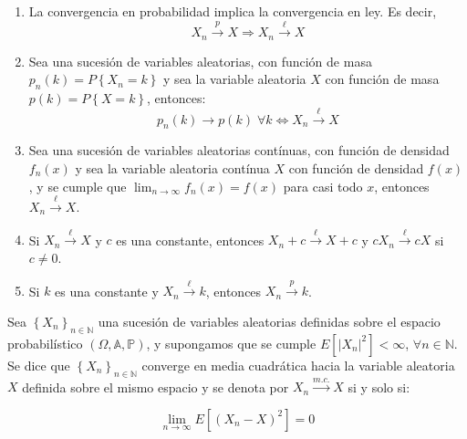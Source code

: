 
\begin{enumerate}
\item 
\begin{teorema}
    La convergencia en probabilidad implica la convergencia en ley. Es decir, 
     \begin{equation}
X_{n} \overset{p}{\to} X \Rightarrow X_{n} \overset{\ell}{\to} X
\end{equation}
\end{teorema}
\item 
\begin{teorema}
    Sea una sucesi\'on de variables aleatorias, con funci\'on de masa $p_n(k)=P\left\{X_n=k\right\}$ y sea la variable aleatoria $X$ con funci\'on de masa $p(k)=P\left\{X=k\right\}$, entonces:
     \begin{equation}
p_{n}(k)\to p(k)\;\forall k \Leftrightarrow X_{n} \overset{\ell}{\to} X
\end{equation}
\end{teorema}
\item 
\begin{teorema}
    Sea una sucesi\'on de variables aleatorias cont\'inuas, con funci\'on de densidad $f_n(x)$ y sea la variable aleatoria cont\'inua $X$ con funci\'on de densidad $f(x)$, y se cumple que $\lim_{n\to\infty}f_n(x)=f(x)$ para casi todo $x$, entonces $X_{n} \overset{\ell}{\to} X$.
\end{teorema}
\item  Si $X_{n} \overset{\ell}{\to} X $ y $c$ es una constante, entonces $X_{n}+c \overset{\ell}{\to} X+c $ y $cX_{n} \overset{\ell}{\to} cX $ si $c\neq0$.
\item  Si $k$ es una constante y $X_{n} \overset{\ell}{\to} k $, entonces $X_{n} \overset{p}{\to} k $.
\end{enumerate}

\begin{definicion}
Sea $ \left\{X_n\right\}_{n\in\mathbb{N}}$ una sucesi\'on de variables aleatorias definidas sobre el espacio probabil\'istico $\left(\Omega,\mathbb{A}, \mathbb{P}\right) $, y supongamos que se cumple $E[|X_n|^2]<\infty$, $\forall n\in\mathbb{N}$. Se dice que $ \left\{X_n\right\}_{n\in\mathbb{N}}$ converge en media cuadr\'atica hacia la variable aleatoria $X$ definida sobre el mismo espacio y se denota por $X_{n} \overset{m.c.}{\to} X $ si y solo si:

\begin{equation}
\lim_{n\to\infty}E[(X_n-X)^2]=0
\end{equation}

\end{definicion}

